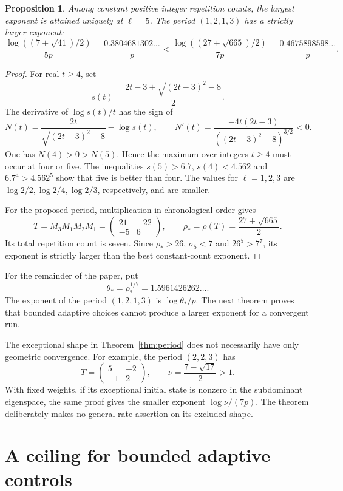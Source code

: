 \documentclass[11pt,a4paper]{article}
\newtheorem{proposition}[theorem]{Proposition}
\numberwithin{equation}{section}
\begin{document}
\begin{proposition}\label{prop:constant}
Among constant positive integer repetition counts, the largest
exponent is attained uniquely at \(\ell=5\). The period
\((1,2,1,3)\) has a strictly larger exponent:
\[
 \frac{\log((7+\sqrt{41})/2)}{5p}
 =\frac{0.3804681302\ldots}{p}
 <\frac{\log((27+\sqrt{665})/2)}{7p}
 =\frac{0.4675898598\ldots}{p}.
\]
\end{proposition}
\begin{proof}
For real \(t\ge4\), set
\[
 s(t)=\frac{2t-3+\sqrt{(2t-3)^2-8}}2.
\]
The derivative of \(\log s(t)/t\) has the sign of
\[
 N(t)=\frac{2t}{\sqrt{(2t-3)^2-8}}-\log s(t),\qquad
 N'(t)=\frac{-4t(2t-3)}{((2t-3)^2-8)^{3/2}}<0.
\]
One has \(N(4)>0>N(5)\). Hence the maximum over integers
\(t\ge4\) must occur at four or five. The inequalities
\(s(5)>6.7\), \(s(4)<4.562\) and \(6.7^4>4.562^5\)
show that five is better than four. The values for
\(\ell=1,2,3\) are \(\log2/2,\log2/4,\log2/3\), respectively,
and are smaller.

For the proposed period, multiplication in chronological order gives
\[
 T=M_3M_1M_2M_1=
 \begin{pmatrix}21&-22\\-5&6\end{pmatrix},\qquad
 \rho_*=\rho(T)=\frac{27+\sqrt{665}}2.
\]
Its total repetition count is seven. Since \(\rho_*>26\),
\(\sigma_5<7\) and \(26^5>7^7\), its exponent is strictly
larger than the best constant-count exponent.
\end{proof}

For the remainder of the paper, put
\[
 \theta_*=\rho_*^{1/7}=1.5961426262\ldots .
\]
The exponent of the period \((1,2,1,3)\) is
\(\log\theta_*/p\). The next theorem proves that bounded adaptive
choices cannot produce a larger exponent for a convergent run.

The exceptional shape in Theorem~\ref{thm:period} does not necessarily
have only geometric convergence. For example, the period
\((2,2,3)\) has
\[
 T=\begin{pmatrix}5&-2\\-1&2\end{pmatrix},\qquad
 \nu=\frac{7-\sqrt{17}}2>1.
\]
With fixed weights, if its exceptional initial state is nonzero in
the subdominant eigenspace, the same proof gives the smaller exponent
\(\log\nu/(7p)\). The theorem deliberately makes no general rate
assertion on its excluded shape.

\section{A ceiling for bounded adaptive controls}
\end{document}
